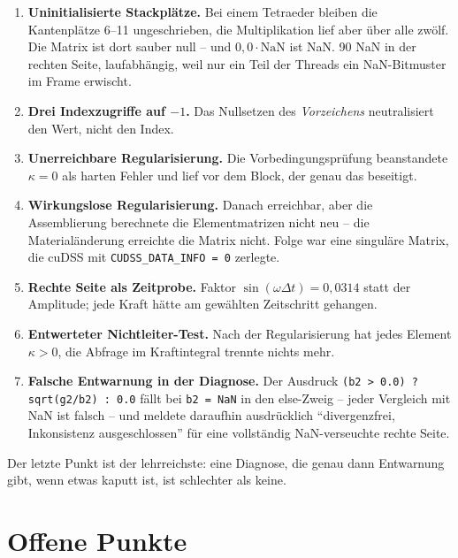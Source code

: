 \documentclass[11pt,a4paper]{article}
\begin{document}
\begin{enumerate}[nosep]
\item \textbf{Uninitialisierte Stackplätze.} Bei einem Tetraeder bleiben die
  Kantenplätze 6--11 ungeschrieben, die Multiplikation lief aber über alle
  zwölf. Die Matrix ist dort sauber null -- und $0{,}0 \cdot \mathrm{NaN}$ ist
  NaN. 90 NaN in der rechten Seite, laufabhängig, weil nur ein Teil der
  Threads ein NaN-Bitmuster im Frame erwischt.
\item \textbf{Drei Indexzugriffe auf $-1$.} Das Nullsetzen des
  \emph{Vorzeichens} neutralisiert den Wert, nicht den Index.
\item \textbf{Unerreichbare Regularisierung.} Die Vorbedingungsprüfung
  beanstandete $\kappa = 0$ als harten Fehler und lief vor dem Block, der
  genau das beseitigt.
\item \textbf{Wirkungslose Regularisierung.} Danach erreichbar, aber die
  Assemblierung berechnete die Elementmatrizen nicht neu -- die
  Materialänderung erreichte die Matrix nicht. Folge war eine singuläre
  Matrix, die cuDSS mit \texttt{CUDSS\_DATA\_INFO = 0} zerlegte.
\item \textbf{Rechte Seite als Zeitprobe.} Faktor $\sin(\omega\Delta t) =
  0{,}0314$ statt der Amplitude; jede Kraft hätte am gewählten Zeitschritt
  gehangen.
\item \textbf{Entwerteter Nichtleiter-Test.} Nach der Regularisierung hat
  jedes Element $\kappa > 0$, die Abfrage im Kraftintegral trennte nichts
  mehr.
\item \textbf{Falsche Entwarnung in der Diagnose.} Der Ausdruck
  \texttt{(b2 > 0.0) ? sqrt(g2/b2) : 0.0} fällt bei
  \texttt{b2 = NaN} in den else-Zweig -- jeder Vergleich mit NaN ist falsch --
  und meldete daraufhin ausdrücklich ``divergenzfrei, Inkonsistenz
  ausgeschlossen'' für eine vollständig NaN-verseuchte rechte Seite.
\end{enumerate}

Der letzte Punkt ist der lehrreichste: eine Diagnose, die genau dann Entwarnung
gibt, wenn etwas kaputt ist, ist schlechter als keine.

\section{Offene Punkte}
\end{document}
